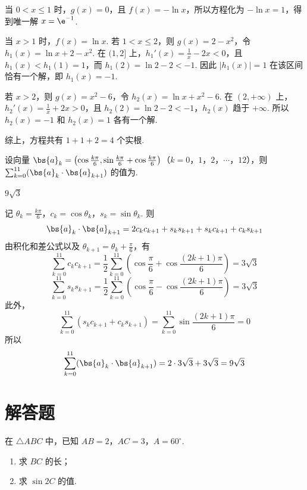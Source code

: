 \begin{solution}
当 \(0<x\leqslant1\) 时，\(g(x)=0\)，且 \(f(x)=-\ln x\)，所以方程化为 \(-\ln x=1\)，得到唯一解 \(x=\e^{-1}\).

当 \(x>1\) 时，\(f(x)=\ln x\). 若 \(1<x\leqslant2\)，则 \(g(x)=2-x^{2}\)，令 \(h_1(x)=\ln x+2-x^{2}\).
在 \((1,2]\) 上，\(h_1'(x)=\frac1x-2x<0\)，且 \(h_1(x)<h_1(1)=1\)，而 \(h_1(2)=\ln2-2<-1\). 因此 \(|h_1(x)|=1\) 在该区间恰有一个解，即 \(h_1(x)=-1\).

若 \(x>2\)，则 \(g(x)=x^{2}-6\)，令 \(h_2(x)=\ln x+x^{2}-6\).
在 \((2,+\infty)\) 上，\(h_2'(x)=\frac1x+2x>0\)，且 \(h_2(2)=\ln2-2<-1\)，\(h_2(x)\) 趋于 \(+\infty\). 所以 \(h_2(x)=-1\) 和 \(h_2(x)=1\) 各有一个解.

综上，方程共有 \(1+1+2=4\) 个实根.
\end{solution}

\begin{problem}
设向量 \(\bs{a}_k = \left(\cos \frac{k\pi}{6}, \sin \frac{k\pi}{6} + \cos \frac{k\pi}{6}\right)\)（\(k = 0\)，\(1\)，\(2\)，\(\cdots\)，\(12\)），则 \(\sum_{k=0}^{11} (\bs{a}_k \cdot \bs{a}_{k+1})\) 的值为\fillinblank{}.
\end{problem}

\begin{answer}
\(9\sqrt{3}\)
\end{answer}

\begin{solution}
记 \(\theta_k=\frac{k\pi}{6}\)，\(c_k=\cos\theta_k\)，\(s_k=\sin\theta_k\). 则
\[
\bs{a}_k\cdot\bs{a}_{k+1}=2c_kc_{k+1}+s_ks_{k+1}+s_kc_{k+1}+c_ks_{k+1}
\]
由积化和差公式以及 \(\theta_{k+1}=\theta_k+\frac{\pi}{6}\)，有
\[
\sum_{k=0}^{11}c_kc_{k+1}=\frac12\sum_{k=0}^{11}\left(\cos\frac{\pi}{6}+\cos\frac{(2k+1)\pi}{6}\right)=3\sqrt3
\]
\[
\sum_{k=0}^{11}s_ks_{k+1}=\frac12\sum_{k=0}^{11}\left(\cos\frac{\pi}{6}-\cos\frac{(2k+1)\pi}{6}\right)=3\sqrt3
\]
此外，
\[
\sum_{k=0}^{11}(s_kc_{k+1}+c_ks_{k+1})=\sum_{k=0}^{11}\sin\frac{(2k+1)\pi}{6}=0
\]
所以
\[
\sum_{k=0}^{11}(\bs{a}_k\cdot\bs{a}_{k+1})=2\cdot3\sqrt3+3\sqrt3=9\sqrt3
\]
\end{solution}

\section{解答题}

\begin{problem}
在 \(\triangle ABC\) 中，已知 \(AB = 2\)，\(AC = 3\)，\(A = 60^{\circ}\).
\begin{enumerate}
\item 求 \(BC\) 的长；
\item 求 \(\sin 2C\) 的值.
\end{enumerate}
\end{problem}

